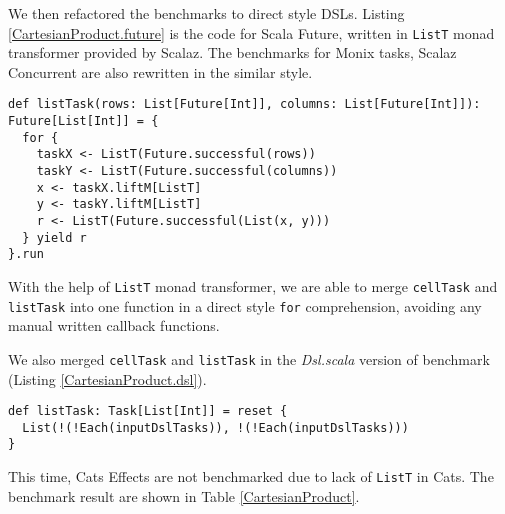 We then refactored the benchmarks to direct style DSLs. Listing \ref{CartesianProduct.future} is the code for Scala Future, written in \lstinline{ListT} monad transformer provided by Scalaz. The benchmarks for Monix tasks, Scalaz Concurrent are also rewritten in the similar style.

\begin{lstlisting}[float=htbp,caption={Cartesian product for Scala Future, based on \lstinline{ListT} transformer},label={CartesianProduct.future}]
def listTask(rows: List[Future[Int]], columns: List[Future[Int]]): Future[List[Int]] = {
  for {
    taskX <- ListT(Future.successful(rows))
    taskY <- ListT(Future.successful(columns))
    x <- taskX.liftM[ListT]
    y <- taskY.liftM[ListT]
    r <- ListT(Future.successful(List(x, y)))
  } yield r
}.run
\end{lstlisting}

With the help of \lstinline{ListT} monad transformer, we are able to merge \lstinline{cellTask} and \lstinline{listTask} into one function in a direct style \lstinline{for} comprehension, avoiding any manual written callback functions.

We also merged \lstinline{cellTask} and \lstinline{listTask} in the \textit{Dsl.scala} version of benchmark (Listing \ref{CartesianProduct.dsl}).

\begin{lstlisting}[float=htbp,caption={Cartesian product for ordinary CPS functions, in one function},label={CartesianProduct.dsl}]
def listTask: Task[List[Int]] = reset {
  List(!(!Each(inputDslTasks)), !(!Each(inputDslTasks)))
}
\end{lstlisting}

This time, Cats Effects are not benchmarked due to lack of \lstinline{ListT} in Cats. The benchmark result are shown in Table \ref{CartesianProduct}.

